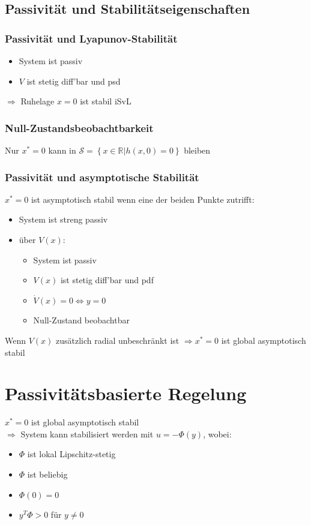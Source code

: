\documentclass[german]{latex4ei/latex4ei_sheet}
\begin{document}
\subsection{Passivität und Stabilitätseigenschaften}

\subsubsection*{Passivität und Lyapunov-Stabilität}
\begin{itemize}
  \item System ist passiv
  \item $V$ ist stetig diff'bar und psd
\end{itemize}
$\Rightarrow$ Ruhelage $x=0$ ist stabil iSvL

\subsubsection*{Null-Zustandsbeobachtbarkeit}
Nur $x^*=0$ kann in $\mathcal{S} = \left\{ x \in \mathbb{R} | h(x,0)=0 \right\}$ bleiben

\subsubsection*{Passivität und asymptotische Stabilität}
$x^*=0$ ist asymptotisch stabil wenn eine der beiden Punkte zutrifft: \\
\begin{itemize}
  \item System ist streng passiv
  \item über $V(x)$:
    \begin{itemize}
      \item System ist passiv
      \item $V(x)$ ist stetig diff'bar und pdf
      \item $\dot{V}(x) = 0 \Leftrightarrow y = 0$
      \item Null-Zustand beobachtbar
    \end{itemize}
\end{itemize}

Wenn $V(x)$ zusätzlich radial unbeschränkt ist $\Rightarrow x^* = 0$ ist global asymptotisch stabil


\section{Passivitätsbasierte Regelung}
$x^* = 0$ ist global asymptotisch stabil\\
$\Rightarrow$ System kann stabilisiert werden mit $u = -\Phi(y)$, wobei:
\begin{itemize}
  \item $\Phi$ ist lokal Lipschitz-stetig
  \item $\Phi$ ist beliebig
  \item $\Phi(0) = 0$
  \item $y^T \Phi > 0$ für $y \neq 0$
\end{itemize}
\end{document}
